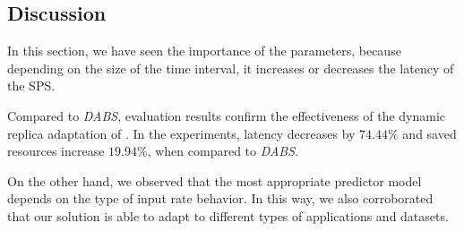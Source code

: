 \subsection{Discussion}
In this section, we have seen the importance of the parameters, because depending on the size of the time interval, it increases or decreases the latency of the SPS.

Compared to \textit{DABS}, evaluation results confirm the effectiveness of the dynamic replica adaptation of \pSPS{}. In the experiments, latency decreases by $74.44\%$ and saved resources increase $19.94\%$, when compared to \textit{DABS}. 

On the other hand, we observed that the most appropriate predictor model depends on the type of input rate behavior. In this way, we also corroborated that our solution is able to adapt to different types of applications and datasets.